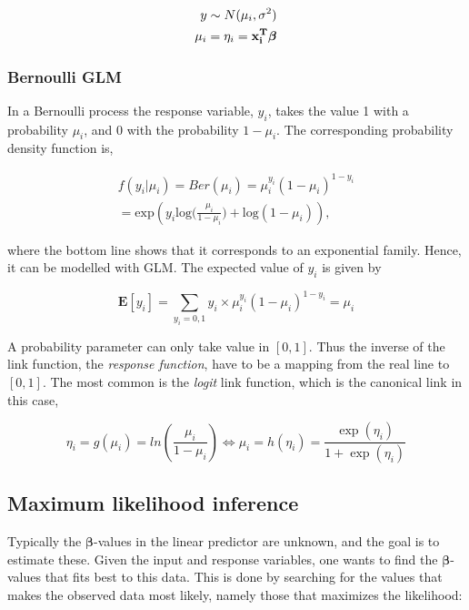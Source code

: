 \begin{equation}
\begin{split}
y \sim N(\mu_i, \sigma^2) \\
\mu_i = \eta_i = \bf x_i^T \bm{ \beta}
\end{split}
\end{equation}

\subsubsection{Bernoulli GLM}

In a Bernoulli process the response variable, $y_i$, takes the value 1 with a probability $\mu_i$, and 0 with the probability $1-\mu_i$. The corresponding probability density function is,

\begin{equation}
\begin{split}
    f(y_i|\mu_i) = Ber(\mu_i) = \mu_i^{y_i}(1-\mu_i)^{1-y_i}\\
    = \text{exp} ( y_i  \text{log}\big(\frac{\mu_i}{1-\mu_i}\big) + \text{log}(1-\mu_i)),
\end{split}
\end{equation}

where the bottom line shows that it corresponds to an exponential family. Hence, it can be modelled with GLM. The expected value of $y_i$ is given by

\begin{equation}
\mathbf{E} [y_i] = \sum_{y_i = 0,1} y_i \times \mu_i^{y_i}(1-\mu_i)^{1-y_i} = \mu_i
\end{equation}

A probability parameter can only take value in $[0,1]$. Thus the inverse of the link function, the \textit{response function}, have to be a mapping from the real line to $[0,1]$. The most common is the \textit{logit} link function, which is the canonical link in this case,

\begin{equation}
    \eta_i = g(\mu_i) = ln(\frac{\mu_i}{1-\mu_i}) \Leftrightarrow 
    \mu_i = h(\eta_i) = \frac{\exp(\eta_i)}{1+\exp(\eta_i)}
\end{equation}


\subsection{Maximum likelihood inference}
\label{sec:Inference}

Typically the $\bm {\beta}$-values in the linear predictor are unknown, and the goal is to estimate these. Given the input and response variables, one wants to find the $\bm {\beta}$-values that fits best to this data. This is done by searching for the values that makes the observed data most likely, namely those that maximizes the likelihood:

